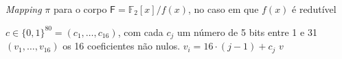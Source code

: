 \begin{algorithm}
  \caption{\textit{Mapping} $\pi$ para o corpo $\mathsf{F} = \mathbb{F}_2[x]/f(x)$, no caso em que $f(x)$ é redutível}\label{alg:pi_reduc}

  \begin{algorithmic}
    \Require $c \in \{0, 1\}^{80} = (c_1, \dotsc, c_16)$, com cada $c_j$ um número de 5 bits entre 1 e 31
    \Ensure $(v_1, \dotsc, v_{16})$ os 16 coeficientes não nulos.
    \State    $v_i = 16 \cdot (j - 1) + c_j$
    \EndFor
    \State \Return $v$
  \end{algorithmic}
\end{algorithm}
